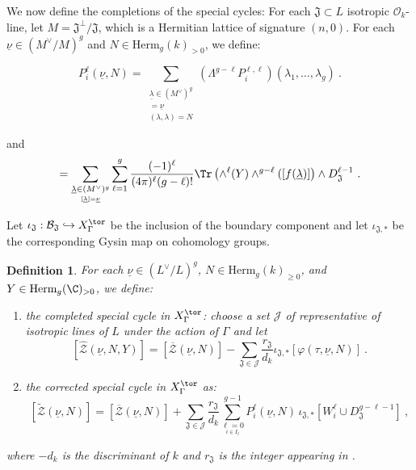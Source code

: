 \documentclass[11pt,letterpaper,english]{amsart}
\numberwithin{equation}{subsection}
\numberwithin{equation}{section}
\newcommand\cB{{\mathcal B}}
\newcommand\cJ{{\mathcal J}}
\newcommand\cO{{\mathcal O}}
\newcommand\cZ{{\mathcal Z}}
\newcommand\fJ{{\mathfrak J}}
\theoremstyle{plain}
\newtheorem{definition}[theorem]{Definition}
\theoremstyle{remark}
\begin{document}
We now define the completions of the special cycles: For each $\fJ\subset L$ isotropic $\cO_k$-line, let $M=\fJ^\bot/\fJ$, which is a Hermitian lattice of signature $(n,0)$. For each $\underline{\nu}\in (M^\vee/M)^g$ and $N\in \mathrm{Herm}_{g}(k)_{>0}$, we define: 

\[P_i^{\ell}(\underline{\nu},N)=\sum_{\substack{ {\underline\lambda\in(M^\vee)^g}\\
[\underline \lambda]=\underline{\nu}\\
{(\lambda,\lambda) = N}}}
(\Lambda^{g-\ell}P_i^{\ell,\ell})(\lambda_1,\ldots,\lambda_g)~.\]

and 
\begin{align*}
[\varphi(\tau,\underline{\nu},N)]=\sum_{\underset{[\underline \lambda]=\underline{\nu}}{\underline\lambda\in(M^\vee)^g}}\sum_{\ell=1}^{g}\frac{(-1)^\ell}{(4\pi)^\ell(g-\ell)!} \Tr\left(\wedge^{\ell}(Y)\wedge^{g-\ell}([f(\underline{\lambda})]\right)\wedge D_{\fJ}^{\ell-1}~.
\end{align*}

Let $\iota_\fJ:\cB_\fJ\hookrightarrow  X_\Gamma^{\tor}$ be the inclusion of the boundary component and let $\iota_{\fJ,*}$ be the corresponding Gysin map on cohomology groups.


\begin{definition}\label{def:completed-cycle}
For each $\underline{\nu}\in (L^\vee/L)^g$, $N\in \mathrm{Herm}_{g}(k)_{\geq 0}$, and $Y\in \mathrm{Herm}_{g}(\C)_{> 0}$, we define:

\begin{enumerate}
\item the completed special cycle in $X_\Gamma^{\tor}$: choose a set $\cJ$ of representative of isotropic lines of $L$ under the action of $\Gamma$ and let 
  \[[\widehat{\cZ}(\underline{\nu},N,Y)]=[\overline{\cZ}(\underline{\nu},N)]-\sum_{\fJ\in\cJ}\frac{r_\fJ}{d_k}\iota_{\fJ,*}[\varphi(\tau,\underline{\nu},N)]~.\]

\item the corrected special cycle in $X_\Gamma^{\tor}$ as: 
  \[[\widetilde{\cZ}(\underline{\nu},N)]=[\overline{\cZ}(\underline{\nu},N)]+\sum_{\fJ\in \cJ}\frac{r_\fJ}{d_k}\sum_{ \underset{i\in I_{\ell}}{\ell=0}}^{g-1}P^\ell_i(\underline{\nu},N)\, \iota_{\fJ,*}[W^\ell_{i}\cup D_{\fJ}^{g-\ell-1}]~,\]
  \end{enumerate}

  where $-d_k$ is the discriminant of $k$ and $r_\fJ$ is the integer appearing in .
\end{definition}
\end{document}

